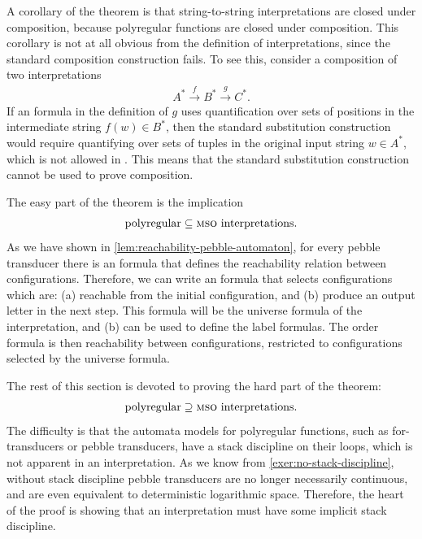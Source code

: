 A corollary of the theorem is that string-to-string \mso interpretations are closed under composition, because polyregular functions are closed under composition.  This corollary is not at all obvious from the definition of \mso interpretations, since the standard composition construction fails. To see this, consider a composition of two
\mso interpretations
\begin{align*}
A^* \xrightarrow f B^* \xrightarrow g C^*.
\end{align*}
If an \mso formula in the definition of $g$ uses quantification over sets of positions in the intermediate string $f(w) \in B^*$, then the standard  substitution construction  would require  quantifying over sets of tuples in the original input string $w \in A^*$, which is not allowed in \mso. This means that the standard substitution construction cannot be used to prove composition.




The easy part of the theorem is the implication
\begin{align*}
\text{polyregular} \subseteq \text{\mso interpretations}.
\end{align*}
As we have shown in \cref{lem:reachability-pebble-automaton}, for every pebble transducer there is  an \mso formula that defines the reachability relation between  configurations. Therefore, we can write an \mso  formula that selects configurations which are: (a) reachable from the initial configuration, and (b)  produce an output letter in the next step. This formula will be the universe formula of the interpretation, and (b) can be used to define the label formulas. The order formula  is then reachability between configurations, restricted to configurations selected by the universe formula. 


The rest of this section is devoted to proving the hard part of the theorem:
\begin{align*}
\text{polyregular} \supseteq \text{\mso interpretations}.
\end{align*}
The difficulty is that the automata models for polyregular functions, such as for-transducers or pebble transducers, have a stack discipline on their loops, which is not apparent in an \mso interpretation. As we know from \cref{exer:no-stack-discipline}, without stack discipline pebble transducers are no longer necessarily continuous, and are even equivalent to deterministic logarithmic space. Therefore, the heart of the proof is showing that an \mso interpretation must have some implicit stack discipline.

